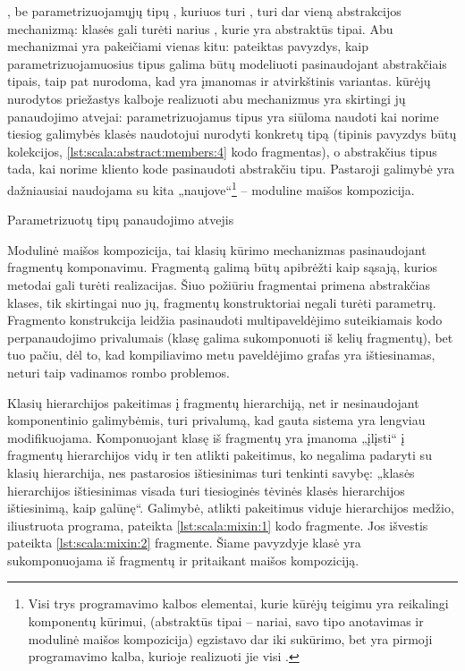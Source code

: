 , be parametrizuojamųjų tipų , kuriuos
turi , turi dar vieną abstrakcijos mechanizmą:
 klasės gali turėti narius , kurie
yra abstraktūs tipai. Abu mechanizmai yra pakeičiami vienas kitu:
\cite[10]{scala-overview} pateiktas pavyzdys, kaip parametrizuojamuosius
tipus galima būtų modeliuoti pasinaudojant abstrakčiais tipais, taip
pat nurodoma, kad yra įmanomas ir atvirkštinis variantas.
 kūrėjų \cite[11]{scala-overview} nurodytos
priežastys kalboje realizuoti abu mechanizmus yra skirtingi jų
panaudojimo atvejai: parametrizuojamus tipus yra siūloma naudoti kai
norime tiesiog galimybės klasės naudotojui nurodyti konkretų tipą
(tipinis pavyzdys būtų kolekcijos, \ref{lst:scala:abstract:members:4}
kodo fragmentas), o abstrakčius tipus tada, kai norime kliento kode
pasinaudoti abstrakčiu tipu. Pastaroji galimybė yra dažniausiai
naudojama su kita  „naujove“\footnote{
Visi trys programavimo kalbos elementai, kurie 
kūrėjų teigimu yra reikalingi komponentų kūrimui, (abstraktūs
tipai – nariai, savo tipo anotavimas ir modulinė maišos kompozicija)
egzistavo dar iki  sukūrimo, bet 
yra pirmoji programavimo kalba, kurioje realizuoti jie visi
\cite[2]{scalable-component-abstractions}.} – moduline maišos
kompozicija.

\begin{scalainterpreterlisting}
  \caption{Parametrizuotų tipų panaudojimo atvejis}
  \label{lst:scala:abstract:members:4}
\end{scalainterpreterlisting}

Modulinė maišos kompozicija, tai klasių kūrimo mechanizmas
pasinaudojant fragmentų  komponavimu. Fragmentą galimą
būtų apibrėžti kaip sąsają, kurios metodai gali turėti
realizacijas. Šiuo požiūriu fragmentai primena abstrakčias klases,
tik skirtingai nuo jų, fragmentų konstruktoriai negali turėti
parametrų. Fragmento konstrukcija leidžia pasinaudoti
multipaveldėjimo suteikiamais kodo perpanaudojimo privalumais
(klasę galima sukomponuoti iš kelių fragmentų), bet tuo pačiu, dėl
to, kad kompiliavimo metu paveldėjimo grafas yra ištiesinamas, neturi
taip vadinamos rombo problemos.

Klasių hierarchijos pakeitimas į fragmentų hierarchiją, net ir
nesinaudojant komponentinio galimybėmis, turi privalumą, kad
gauta sistema yra lengviau modifikuojama. Komponuojant klasę iš
fragmentų yra įmanoma „įlįsti“ į fragmentų hierarchijos vidų
ir ten atlikti pakeitimus, ko negalima padaryti su klasių hierarchija,
nes pastarosios ištiesinimas turi tenkinti savybę: „klasės hierarchijos
ištiesinimas visada turi tiesioginės tėvinės klasės hierarchijos
ištiesinimą, kaip galūnę“\cite[57]{scala-reference}. Galimybė,
atlikti pakeitimus viduje hierarchijos medžio, iliustruota programa,
pateikta \ref{lst:scala:mixin:1} kodo fragmente. Jos išvestis pateikta
\ref{lst:scala:mixin:2} fragmente. Šiame pavyzdyje klasė 
yra sukomponuojama iš fragmentų  ir  pritaikant
maišos kompoziciją.

